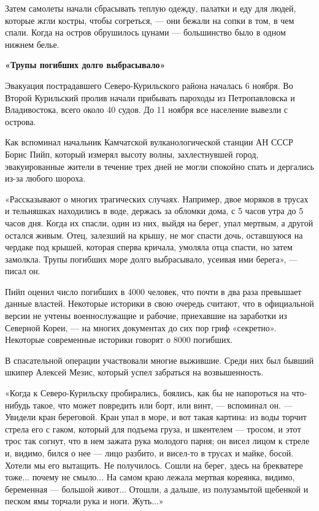 Затем самолеты начали сбрасывать теплую одежду, палатки и еду для людей, которые жгли костры, чтобы согреться, --- они бежали на сопки в том, в чем спали. Когда на остров обрушилось цунами --- большинство было в одном нижнем белье.

\textbf{«Трупы погибших долго выбрасывало»}

Эвакуация пострадавшего Северо-Курильского района началась 6 ноября. Во Второй Курильский пролив начали прибывать пароходы из Петропавловска и Владивостока, всего около 40 судов. До 11 ноября все население вывезли с острова.

Как вспоминал начальник Камчатской вулканологической станции АН СССР Борис Пийп, который измерял высоту волны, захлестнувшей город, эвакуированные жители в течение трех дней не могли спокойно спать и дергались из-за любого шороха.

«Рассказывают о многих трагических случаях. Например, двое моряков в трусах и тельняшках находились в воде, держась за обломки дома, с 5 часов утра до 5 часов дня. Когда их спасли, один из них, выйдя на берег, упал мертвым, а другой остался живым. Отец, залезший на крышу, не мог спасти дочь, оставшуюся на чердаке под крышей, которая сперва кричала, умоляла отца спасти, но затем замолкла. Трупы погибших море долго выбрасывало, усеивая ими берега», --- писал он.

Пийп оценил число погибших в 4000 человек, что почти в два раза превышает данные властей. Некоторые историки в свою очередь считают, что в официальной версии не учтены военнослужащие и рабочие, приехавшие на заработки из Северной Кореи, --- на многих документах до сих пор гриф «секретно». Некоторые современные историки говорят о 8000 погибших.

В спасательной операции участвовали многие выжившие. Среди них был бывший шкипер Алексей Мезис, который успел забраться на возвышенность.

«Когда к Северо-Курильску пробирались, боялись, как бы не напороться на что-нибудь такое, что может повредить или борт, или винт, --- вспоминал он. --- Увидели кран береговой. Кран упал в море, и вот такая картина: из воды торчит стрела его с гаком, который для подъема груза, и шкентелем --- тросом, и этот трос так согнут, что в нем зажата рука молодого парня; он висел лицом к стреле и, видимо, бился о нее --- лицо разбито, и висел-то в трусах и майке, босой. Хотели мы его вытащить. Не получилось. Сошли на берег, здесь на брекватере тоже... почему не смыло... На самом краю лежала мертвая кореянка, видимо, беременная --- большой живот... Отошли, а дальше, из полузамытой щебенкой и песком ямы торчали рука и ноги. Жуть...»

